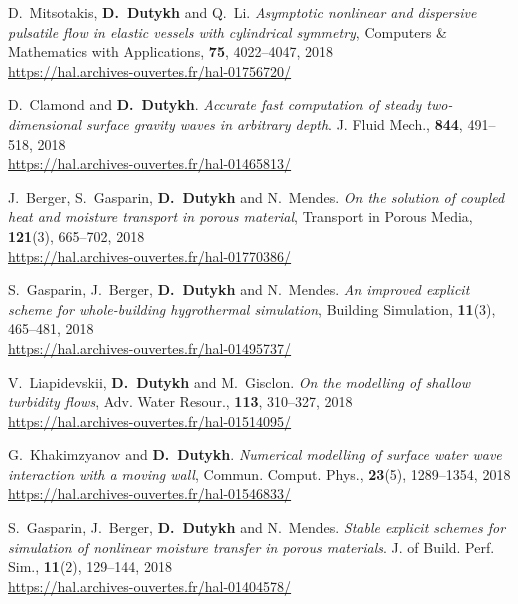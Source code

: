 \begin{etaremune}
  \item D.~Mitsotakis, \textbf{D.~Dutykh} and Q.~Li. \textit{Asymptotic nonlinear and dispersive pulsatile flow in elastic vessels with cylindrical symmetry}, Computers \& Mathematics with Applications, \textbf{75}, 4022--4047, 2018 \\ %
  \url{https://hal.archives-ouvertes.fr/hal-01756720/}

  \item D.~Clamond and \textbf{D.~Dutykh}. \textit{Accurate fast computation of steady two-dimensional surface gravity waves in arbitrary depth}. J. Fluid Mech., \textbf{844}, 491--518, 2018 \\ %
  \url{https://hal.archives-ouvertes.fr/hal-01465813/}

  \item J.~Berger, S.~Gasparin, \textbf{D.~Dutykh} and N.~Mendes. \textit{On the solution of coupled heat and moisture transport in porous material}, Transport in Porous Media, \textbf{121}(3), 665--702, 2018 \\ %
  \url{https://hal.archives-ouvertes.fr/hal-01770386/}

  \item S.~Gasparin, J.~Berger, \textbf{D.~Dutykh} and N.~Mendes. \textit{An improved explicit scheme for whole-building hygrothermal simulation}, Building Simulation, \textbf{11}(3), 465--481, 2018 \\ %
  \url{https://hal.archives-ouvertes.fr/hal-01495737/}
  
  \item V.~Liapidevskii, \textbf{D.~Dutykh} and M.~Gisclon. \textit{On the modelling of shallow turbidity flows}, Adv. Water Resour., \textbf{113}, 310--327, 2018 \\ %
  \url{https://hal.archives-ouvertes.fr/hal-01514095/}

  \item G.~Khakimzyanov and \textbf{D.~Dutykh}. \textit{Numerical modelling of surface water wave interaction with a moving wall}, Commun. Comput. Phys., \textbf{23}(5), 1289--1354, 2018 \\ %
  \url{https://hal.archives-ouvertes.fr/hal-01546833/}

  \item S.~Gasparin, J.~Berger, \textbf{D.~Dutykh} and N.~Mendes. \textit{Stable explicit schemes for simulation of nonlinear moisture transfer in porous materials}. J. of Build. Perf. Sim., \textbf{11}(2), 129--144, 2018 \\ %
  \url{https://hal.archives-ouvertes.fr/hal-01404578/}


\end{etaremune}

